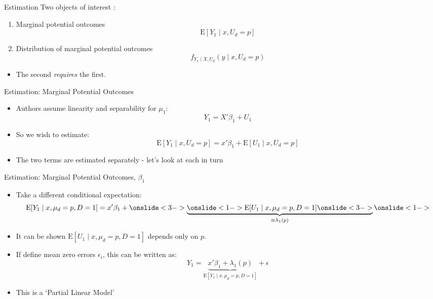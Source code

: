 \documentclass{beamer}
\begin{document}
\begin{frame}{Estimation}
  Two objects of interest :
\begin{enumerate}
\item Marginal potential outcomes
\begin{equation*}
  \mathrm{E}[Y_1\mid x,U_d=p]
\end{equation*}
\item Distribution of marginal potential outcomes
  \begin{equation*}
    f_{Y_1\mid X,U_d}(y\mid x,U_d=p)
  \end{equation*}
\end{enumerate}
\begin{itemize}
\item The second \textit{requires} the first.
\end{itemize}

\end{frame}


\begin{frame}{Estimation: Marginal Potential Outcomes  }
  \begin{itemize}
  \item Authors assume linearity and separability for $\mu_1$:
    \begin{equation*}
      Y_1  = X'\beta_1 +  U_1
    \end{equation*} \pause
\item So we wish to estimate:
    \begin{equation*}
      \mathrm{E}[Y_1\mid x,U_d=p]  = x'\beta_1 +  \mathrm{E}[U_1\mid x,U_d=p]
    \end{equation*} \pause
\item The two terms are estimated separately - let's look at each in turn
  \end{itemize}
\end{frame}

\begin{frame}{Estimation:  Marginal Potential Outcomes, $\beta_1$}
  \begin{itemize}
\item Take a different conditional expectation:
 \belowdisplayskip=0pt
\begin{equation*}
  \mathrm{E}[Y_1\mid x, \mu_d=p,D=1] = x'\beta_1 +  \onslide<3->\underbrace{\onslide<1->\mathrm{E}[U_1\mid x,\mu_d=p,
  D=1   ] \onslide<3->}_{\equiv \lambda_1(p) }  \onslide<1->
\end{equation*} \pause
\item It can be shown $\mathrm{E}[U_1\mid x,\mu_d=p,
  D=1   ]$ depends only on $p$. 
\item If define mean zero errors $\epsilon_i$, this can be written as:
 \begin{equation*}
    Y_1 = \underbrace{x'\beta_1 +  \lambda_1(p)}_{\mathrm{E}[Y_1\mid x, \mu_d=p,D=1]} + \epsilon
  \end{equation*}
\item This is a `Partial Linear Model'
\end{itemize}
\end{frame}
\end{document}
